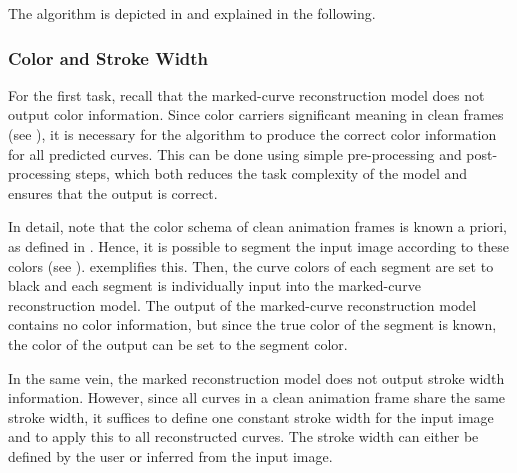 The algorithm is depicted in  and explained in the following.

\subsubsection{Color and Stroke Width}
\label{subsubsec:colorstroke}

For the first task, recall that the marked-curve reconstruction model does not output color information. Since color carriers significant meaning in clean frames (see ), it is necessary for the algorithm to produce the correct color information for all predicted curves. This can be done using simple pre-processing and post-processing steps, which both reduces the task complexity of the model and ensures that the output is correct.

In detail, note that the color schema of clean animation frames is known a priori, as defined in . Hence, it is possible to segment the input image according to these colors (see ).  exemplifies this. Then, the curve colors of each segment are set to black and each segment is individually input into the marked-curve reconstruction model. The output of the marked-curve reconstruction model contains no color information, but since the true color of the segment is known, the color of the output can be set to the segment color.%

In the same vein, the marked reconstruction model does not output stroke width information. However, since all curves in a clean animation frame share the same stroke width, it suffices to define one constant stroke width for the input image and to apply this to all reconstructed curves. The stroke width can either be defined by the user or inferred from the input image.

